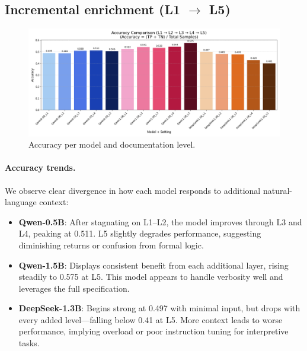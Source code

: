 \documentclass[a4paper]{usiinfbachelorproject}
\begin{document}
\subsection{Incremental enrichment (L1 $\rightarrow$ L5)}

\begin{figure}[H]\centering
  \includegraphics[width=0.95\linewidth]{figures/accuracy_comparison.png}
  \caption{Accuracy per model and documentation level.}
  \label{fig:acc-l1-l5}
\end{figure}

\paragraph*{Accuracy trends.}
We observe clear divergence in how each model responds to additional natural-language context:

\begin{itemize}[leftmargin=12pt]
  \item \textbf{Qwen-0.5B}: After stagnating on L1–L2, the model improves through L3 and L4, peaking at 0.511. L5 slightly degrades performance, suggesting diminishing returns or confusion from formal logic.
  
  \item \textbf{Qwen-1.5B}: Displays consistent benefit from each additional layer, rising steadily to 0.575 at L5. This model appears to handle verbosity well and leverages the full specification.

  \item \textbf{DeepSeek-1.3B}: Begins strong at 0.497 with minimal input, but drops with every added level—falling below 0.41 at L5. More context leads to worse performance, implying overload or poor instruction tuning for interpretive tasks.
\end{itemize}
\end{document}
